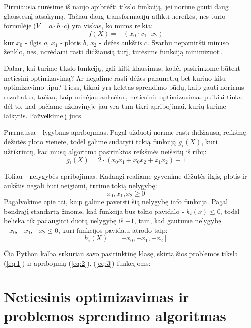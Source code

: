 \documentclass{article}
\begin{document}
Pirmiausia turėsime iš naujo apibrėžti tikslo funkciją, jei norime gauti daug glaustesnį atsakymą. Tačiau daug transformacijų atlikti nereikės, nes tūrio formulėje ($V = a\cdot b\cdot c$) yra viskas, ko mums reikia:
\begin{equation}\label{eq:1}
    f(X) = -(x_{0}\cdot x_{1}\cdot x_{2})
\end{equation}
kur $x_{0}$ - ilgis $a$, $x_{1}$ - plotis $b$, $x_{2}$ - dėžės aukštis $c$. Svarbu nepamiršti minuso ženklo, nes, norėdami rasti didžiausią tūrį, turėsime funkciją minimizuoti. 

Dabar, kai turime tikslo funkciją, gali kilti klausimas, kodėl pasirinkome būtent netiesinį optimizavimą? Ar negalime rasti dėžės parametrų bet kuriuo kitu optimizavimo tipu? Tiesa, tikrai yra keletas sprendimo būdų, kaip gauti norimus rezultatus, tačiau, kaip minėjau anksčiau, netiesinis optimizavimas puikiai tinka dėl to, kad pačiame uždavinyje jau yra tam tikri apribojimai, kurių turime laikytis. Pažvelkime į juos.

Pirmiausia - lygybinis apribojimas. Pagal užduotį norime rasti didžiausią reikšmę dėžutės ploto vienete, todėl galime sudaryti tokią funkciją $g_{i}(X)$, kuri užtikrintų, kad mūsų algoritmo pasirinktos reikšmės neišeitų iš ribų:
\begin{equation}\label{eq:2}
    g_{i}(X) = 2\cdot(x_{0}x_{1}+x_{0}x_{2}+x_{1}x_{2}) - 1
\end{equation}

Toliau - nelygybės apribojimas. Kadangi realiame gyvenime dėžutės ilgis, plotis ir aukštis negali būti neigiami, turime tokią nelygybę:
\begin{equation*}
    x_{0},x_{1},x_{2}\geq 0
\end{equation*}
Pagalvokime apie tai, kaip galime paversti šią nelygybę info funkcija. Pagal bendrąjį standartą žinome, kad funkcija bus tokio pavidalo - $h_i(x)\leq 0$, todėl belieka tik padauginti duotą nelygybę iš $-1$, tam, kad gautume nelygybę $-x_{0},-x_{1},-x_{2}\leq0$, kuri funkcijos pavidalu atrodo taip:
\begin{equation}\label{eq:3}
    h_{i}(X) = [-x_{0}, -x_{1}, -x_{2}]
\end{equation}

Čia Python kalba sukūriau savo pasirinktinę klasę, skirtą šios problemos tikslo (\ref{eq:1}) ir apribojimų (\ref{eq:2}), (\ref{eq:3}) funkcijoms:
\section{Netiesinis optimizavimas ir problemos sprendimo algoritmas}
\end{document}
